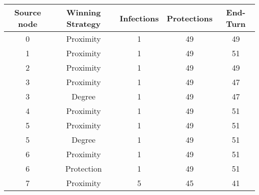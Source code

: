 \documentclass[results.tex]{subfiles}
\begin{document}
    \begin{center}
        \begin{tabular}{| c || c | c | c | c |}
            \hline
            {\bfseries Source node} & {\bfseries Winning Strategy} & {\bfseries Infections} & {\bfseries Protections}
            & {\bfseries End-Turn}
            \\  %
            \hline\hline
            0                       & Proximity                    & 1                      & 49                      & 49                   \\
            \hline
            1                       & Proximity                    & 1                      & 49                      & 51                   \\
            \hline
            2                       & Proximity                    & 1                      & 49                      & 49                   \\
            \hline
            3                       & Proximity                    & 1                      & 49                      & 47                   \\
            \hline
            3                       & Degree                       & 1                      & 49                      & 47                   \\
            \hline
            4                       & Proximity                    & 1                      & 49                      & 51                   \\
            \hline
            5                       & Proximity                    & 1                      & 49                      & 51                   \\
            \hline
            5                       & Degree                       & 1                      & 49                      & 51                   \\
            \hline
            6                       & Proximity                    & 1                      & 49                      & 51                   \\
            \hline
            6                       & Protection                   & 1                      & 49                      & 51                   \\
            \hline
            7                       & Proximity                    & 5                      & 45                      & 41                   \\

\end{tabular}
\end{center}
\end{document}
